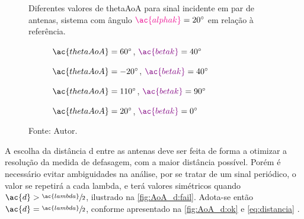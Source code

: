 \begin{figure}
    \caption{Diferentes valores de \ac{thetaAoA} para sinal incidente em par de antenas, sistema com ângulo $\textcolor{cmyk_M}{\ac{alphak}}=\SI{20}{\degree}$ em relação à referência.}
    \label{fig:AoA}

    \hfill
    \begin{subfigure}[b]{0.45\textwidth}
        \centering
        \caption{$ \ac{thetaAoA} = \SI{60}{\degree} $, $ \textcolor{Purple}{\ac{betak}} = \SI{40}{\degree} $}
        
        \label{fig:AoA:1}
    \end{subfigure}
    \hfill
    \begin{subfigure}[b]{0.45\textwidth}
        \centering
        \caption{$ \ac{thetaAoA} = \SI{-20}{\degree} $, $ \textcolor{Purple}{\ac{betak}} = \SI{40}{\degree} $}
        
        \label{fig:AoA:2}
    \end{subfigure}
    \hfill

    \vspace{\floatsep}

    \hfill
    \begin{subfigure}[b]{0.45\textwidth}
        \centering
        \caption{$ \ac{thetaAoA}=\SI{110}{\degree} $, $ \textcolor{Purple}{\ac{betak}} = \SI{90}{\degree} $}
        
        \label{fig:AoA:3}
    \end{subfigure}
    \hfill
    \begin{subfigure}[b]{0.45\textwidth}
        \centering
        \caption{$ \ac{thetaAoA}=\SI{20}{\degree} $, $ \textcolor{Purple}{\ac{betak}} = \SI{0}{\degree} $}
        
        \label{fig:AoA:4}
    \end{subfigure}
    \hfill

    \caption*{Fonte: Autor.}
\end{figure}


A escolha da distância \ac{d} entre as antenas deve ser feita de forma a otimizar a resolução da medida de defasagem, com a maior distância possível. Porém é necessário evitar ambiguidades na análise, por se tratar de um sinal periódico, o valor se repetirá a cada \ac{lambda}, e terá valores simétricos quando $\ac{d} > \sfrac{\ac{lambda}}{2}$, ilustrado na \autoref{fig:AoA_d:fail}.
Adota-se então $\ac{d}=\sfrac{\ac{lambda}}{2}$, conforme apresentado na \autoref{fig:AoA_d:ok} e \autoref{eq:distancia} \cite{bensky2016wireless, horst2021localization, Schssel2016AngleOA}.

